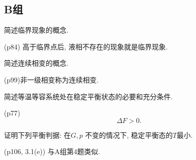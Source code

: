 \subsection{B组}
\begin{questions}
  \question 简述临界现象的概念.
  \begin{solution}
    (p84) 高于临界点后, 液相不存在的现象就是临界现象.
  \end{solution}
  \question 简述连续相变的概念.
  \begin{solution}
    (p99)非一级相变称为连续相变.
  \end{solution}
  \question 简述等温等容系统处在稳定平衡状态的必要和充分条件.
  \begin{solution}
    (p77)
    \begin{equation}
      \Delta F > 0.
    \end{equation}
  \end{solution}
  \question 证明下列平衡判据: 在$G, p$ 不变的情况下, 稳定平衡态的$T$最小.
  \begin{solution}
    (p106, 3.1(e)) 与A组第4题类似.
  \end{solution}
\end{questions}